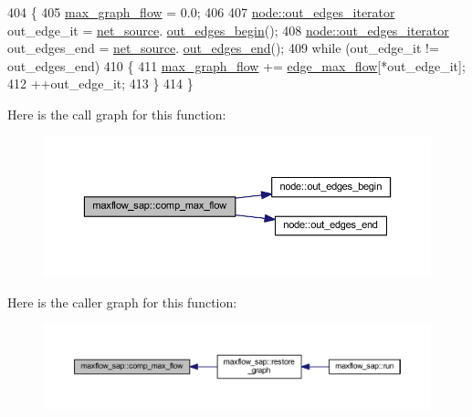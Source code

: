 \begin{DoxyCode}
404 \{
405     \mbox{\hyperlink{classmaxflow__sap_a77c650fd11632352a1228f2cbd38caf1}{max\_graph\_flow}} = 0.0;
406 
407     \mbox{\hyperlink{classnode_a90e17ed34de55072e8077f4367499a98}{node::out\_edges\_iterator}} out\_edge\_it = \mbox{\hyperlink{classmaxflow__sap_abd4266c76dbd73f7f719d3a4fba2655d}{net\_source}}.
      \mbox{\hyperlink{classnode_a7dcb80df22118cea04f77ca8c952d9c2}{out\_edges\_begin}}();
408     \mbox{\hyperlink{classnode_a90e17ed34de55072e8077f4367499a98}{node::out\_edges\_iterator}} out\_edges\_end = \mbox{\hyperlink{classmaxflow__sap_abd4266c76dbd73f7f719d3a4fba2655d}{net\_source}}.
      \mbox{\hyperlink{classnode_a7ce2ba5195a63d4df6b44299a02a9378}{out\_edges\_end}}();
409     \textcolor{keywordflow}{while} (out\_edge\_it != out\_edges\_end)
410     \{
411         \mbox{\hyperlink{classmaxflow__sap_a77c650fd11632352a1228f2cbd38caf1}{max\_graph\_flow}} += \mbox{\hyperlink{classmaxflow__sap_a25820db833a98efc69fc3edb79fc49d3}{edge\_max\_flow}}[*out\_edge\_it];
412         ++out\_edge\_it;
413     \}
414 \}
\end{DoxyCode}
Here is the call graph for this function\+:\nopagebreak
\begin{figure}[H]
\begin{center}
\leavevmode
\includegraphics[width=350pt]{classmaxflow__sap_ae5ff08e7b1c5fe5845a2ed584b04ca1b_cgraph}
\end{center}
\end{figure}
Here is the caller graph for this function\+:\nopagebreak
\begin{figure}[H]
\begin{center}
\leavevmode
\includegraphics[width=350pt]{classmaxflow__sap_ae5ff08e7b1c5fe5845a2ed584b04ca1b_icgraph}
\end{center}
\end{figure}
\mbox{\label{classmaxflow__sap_a617016b94a4924fb2574ab87c970d49c}} 
